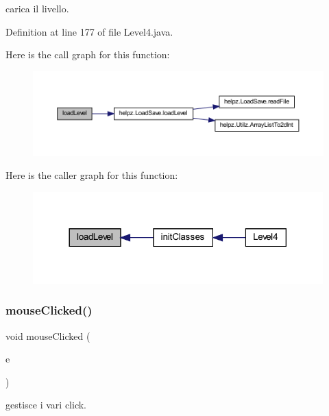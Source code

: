 carica il livello. 



Definition at line 177 of file Level4.\+java.

Here is the call graph for this function\+:
\nopagebreak
\begin{figure}[H]
\begin{center}
\leavevmode
\includegraphics[width=350pt]{classscenes_1_1_level4_a286931cc46e197f4a85af7229fdc29a4_cgraph}
\end{center}
\end{figure}
Here is the caller graph for this function\+:\nopagebreak
\begin{figure}[H]
\begin{center}
\leavevmode
\includegraphics[width=317pt]{classscenes_1_1_level4_a286931cc46e197f4a85af7229fdc29a4_icgraph}
\end{center}
\end{figure}
\mbox{\label{classscenes_1_1_level4_a45d56bd84238e8b56589dfc732e2b2cf}} 
\subsubsection{\texorpdfstring{mouse\+Clicked()}{mouseClicked()}}
{\footnotesize\ttfamily void mouse\+Clicked (\begin{DoxyParamCaption}\item[{Mouse\+Event}]{e }\end{DoxyParamCaption})}



gestisce i vari click. 


